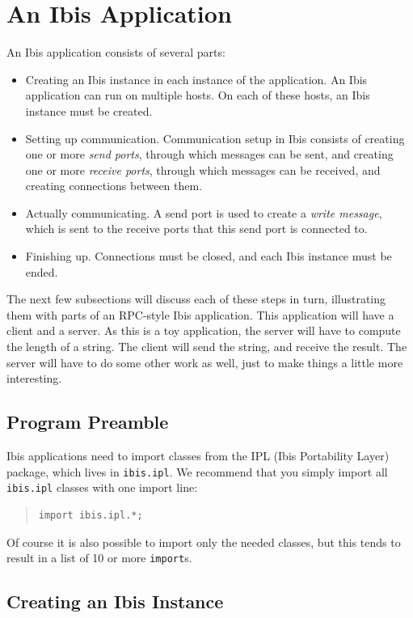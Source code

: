 \documentclass[10pt]{article}
\newcommand{\mysection}[1]{\section{#1}\label{#1}}
\newcommand{\mysubsection}[1]{\subsection{#1}\label{#1}}
\begin{document}
\mysection{An Ibis Application}

An Ibis application consists of several parts:
\begin{itemize}
\item
Creating an Ibis instance in each instance of the application.
An Ibis application can run on multiple hosts.
On each of these hosts, an Ibis instance must be created.
\item
Setting up communication. Communication setup in Ibis
consists of creating one or more \emph{send ports}, through which messages
can be sent, and creating one or more \emph{receive ports},
through which messages can be received, and creating connections between them.
\item
Actually communicating. A send port is used to create a 
\emph{write message}, which is sent to the receive ports that this send port
is connected to.
\item
Finishing up. Connections must be closed, and each Ibis instance must
be ended.
\end{itemize}
\noindent
The next few subsections will discuss each of these steps in turn,
illustrating them with parts of an RPC-style Ibis application.
This application will have a client and a server. As this is a toy
application, the server will have to compute the length of a string.
The client will send the string, and receive the result.
The server will have to do some other work as well, just to make
things a little more interesting.

\subsection{Program Preamble}

Ibis applications need to import classes from the IPL (Ibis
Portability Layer) package, which lives in
\texttt{ibis.ipl}.
We recommend that you simply import all \texttt{ibis.ipl} classes with
one import line:

{\small
\begin{quote}
\begin{verbatim}
import ibis.ipl.*;
\end{verbatim}
\end{quote}
}

\noindent
Of course it is also possible to import only the needed classes, but
this tends to result in a list of 10 or more \texttt{import}s.

\mysubsection{Creating an Ibis Instance}
\end{document}
